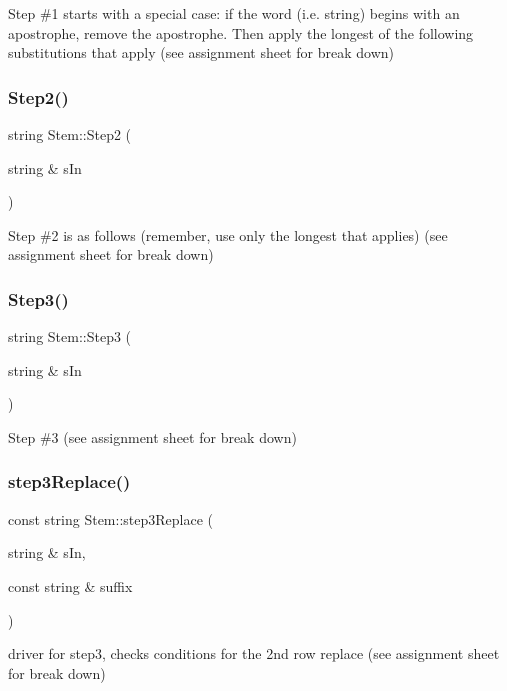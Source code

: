 Step \#1 starts with a special case\+: if the word (i.\+e. string) begins with an apostrophe, remove the apostrophe. Then apply the longest of the following substitutions that apply (see assignment sheet for break down) \mbox{\label{class_stem_adadb6c35d5d8de25bfd4c39c13d47a8d}} 
\subsubsection{\texorpdfstring{Step2()}{Step2()}}
{\footnotesize\ttfamily string Stem\+::\+Step2 (\begin{DoxyParamCaption}\item[{string \&}]{s\+In }\end{DoxyParamCaption})}

Step \#2 is as follows (remember, use only the longest that applies) (see assignment sheet for break down) \mbox{\label{class_stem_ae1e82f3cf3753cad9d99ada7f25d7697}} 
\subsubsection{\texorpdfstring{Step3()}{Step3()}}
{\footnotesize\ttfamily string Stem\+::\+Step3 (\begin{DoxyParamCaption}\item[{string \&}]{s\+In }\end{DoxyParamCaption})}

Step \#3 (see assignment sheet for break down) \mbox{\label{class_stem_a92e01a887a1cdf6cba833639e3fe0bc7}} 
\subsubsection{\texorpdfstring{step3\+Replace()}{step3Replace()}}
{\footnotesize\ttfamily const string Stem\+::step3\+Replace (\begin{DoxyParamCaption}\item[{string \&}]{s\+In,  }\item[{const string \&}]{suffix }\end{DoxyParamCaption})}

driver for step3, checks conditions for the 2nd row replace (see assignment sheet for break down) \mbox{\label{class_stem_a5d10addfe4f64dd68ac05227ae302977}} 
